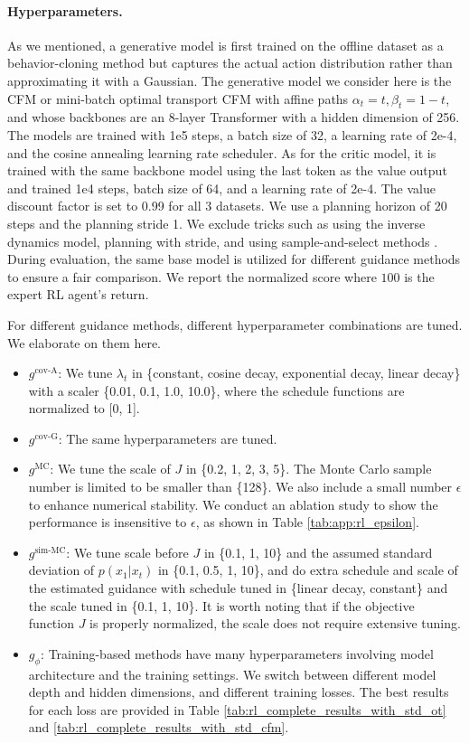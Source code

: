 \paragraph{Hyperparameters.}
As we mentioned, a generative model is first trained on the offline dataset as a behavior-cloning method but captures the actual action distribution rather than approximating it with a Gaussian. The generative model we consider here is the CFM or mini-batch optimal transport CFM with affine paths $\alpha_t= t, \beta_t = 1 - t$, and whose backbones are an 8-layer Transformer with a hidden dimension of 256. The models are trained with 1e5 steps, a batch size of 32, a learning rate of 2e-4, and the cosine annealing learning rate scheduler. As for the critic model, it is trained with the same backbone model using the last token as the value output and trained 1e4 steps, batch size of 64, and a learning rate of 2e-4. The value discount factor is set to 0.99 for all 3 datasets. We use a planning horizon of 20 steps and the planning stride 1. We exclude tricks such
as using the inverse dynamics model, planning with stride,
and using sample-and-select methods \citep{What_Making}.
During evaluation, the same base model is utilized for different guidance methods to ensure a fair comparison. We report the normalized score \citep{d4rl} where $100$ is the expert RL agent's return.

For different guidance methods, different hyperparameter combinations are tuned. We elaborate on them here.
\begin{itemize}
    \item $g^{\text{cov-A}}$: We tune $\lambda_t$ in \{constant, cosine decay, exponential decay, linear decay\} with a scaler \{0.01, 0.1, 1.0, 10.0\}, where the schedule functions are normalized to [0, 1].
    \item $g^{\text{cov-G}}$: The same hyperparameters are tuned. 
    \item $g^{\text{MC}}$: We tune the scale of $J$ in \{0.2, 1, 2, 3, 5\}. The Monte Carlo sample number is limited to be smaller than \{128\}. We also include a small number $\epsilon$ to enhance numerical stability. We conduct an ablation study to show the performance is insensitive to $\epsilon$, as shown in Table \ref{tab:app:rl_epsilon}.
    \item $g^{\text{sim-MC}}$: We tune scale before $J$ in \{0.1, 1, 10\} and the assumed standard deviation of $p(x_1|x_t)$ in \{0.1, 0.5, 1, 10\}, and do extra schedule and scale of the estimated guidance with schedule tuned in \{linear decay, constant\} and the scale tuned in \{0.1, 1, 10\}. It is worth noting that if the objective function $J$ is properly normalized, the scale does not require extensive tuning.
    \item $g_\phi$: Training-based methods have many hyperparameters involving model architecture and the training settings. We switch between different model depth and hidden dimensions, and different training losses. The best results for each loss are provided in Table \ref{tab:rl_complete_results_with_std_ot} and \ref{tab:rl_complete_results_with_std_cfm}.
\end{itemize}

